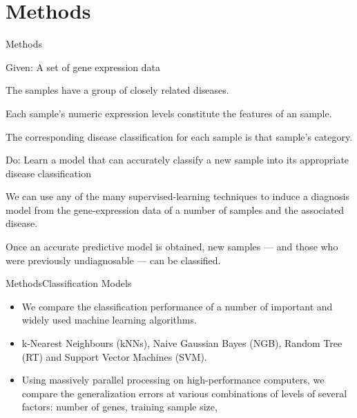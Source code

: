 \documentclass[xcolor=table]{beamer}
\numberwithin{figure}{section}
\numberwithin{equation}{section}
\begin{document}
\section{Methods}

\begin{frame}{Methods}
\begin{exampleblock}{Given: A set of gene expression data}
\begin{itemize}\footnotesize{
    \item The samples have a group of closely related diseases. 
    \item Each sample's numeric expression levels constitute the features of an sample. 
    \item The corresponding disease classification for each sample is that sample's category. }
\end{itemize}
\end{exampleblock}

\begin{exampleblock}{Do: Learn a model that can accurately classify a new sample into its appropriate disease classification}
\begin{itemize}\footnotesize{
    \item We can use any of the many supervised-learning techniques to induce a diagnosis model from the gene-expression data of a number of samples and the associated disease. 
    \item Once an accurate predictive model is obtained, new samples --- and those who were previously undiagnosable --- can be classified. }
\end{itemize}
\end{exampleblock}
\end{frame}

\begin{frame}{Methods}{Classification Models}
  \begin{itemize}
      \item We compare the classification performance of a number of important and widely used machine learning algorithms.
      \item  k-Nearest Neighbours (kNNs), Naive Gaussian Bayes (NGB), Random Tree (RT) and Support Vector Machines (SVM).
      \item Using massively parallel processing on high-performance computers, we compare the generalization errors at various combinations of levels of several factors: number of genes, training sample size, 
  \end{itemize}
\end{frame}
\end{document}
